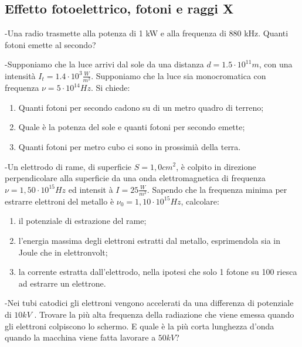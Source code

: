 \documentclass[12pt,twoside,a4]{article}
\begin{document}
\newpage
\subsection{Effetto fotoelettrico, fotoni e raggi X}
\begin{esercizio}
	-Una radio trasmette alla potenza di 1 kW e alla frequenza di 880 kHz. Quanti fotoni emette al secondo?
\end{esercizio}

\begin{esercizio}
	-Supponiamo che la luce arrivi dal sole da una distanza $d=1.5 \cdot 10^{11} m$, con una intensità  $I_t=1.4 \cdot 10^3 \frac{W}{m^2}$. Supponiamo che la luce sia monocromatica con frequenza $\nu =5 \cdot 10^{14} Hz$. Si chiede:
	\begin{enumerate}[label=(\textit{\roman*})]
		\item Quanti fotoni per secondo cadono su di un metro quadro di terreno;
		\item Quale  è la potenza del sole e quanti fotoni per secondo emette;
		\item Quanti fotoni per metro cubo ci sono in prossimià della terra.
	\end{enumerate}
\end{esercizio}

\begin{esercizio}
	-Un elettrodo di rame, di superficie $S=1,0 cm^2$,  è colpito in direzione
perpendicolare alla superficie da una onda elettromagnetica di frequenza $\nu = 1,50 \cdot 10^{15} Hz$ ed intensit à  $I=25\frac{W}{m^2}$. Sapendo che la frequenza minima per estrarre elettroni del metallo  è $\nu_0= 1,10 \cdot 10^{15}Hz$, calcolare:
\begin{enumerate}[label=(\textit{\roman*})]
	\item il potenziale di estrazione del rame;
	\item l'energia massima degli elettroni estratti dal metallo, esprimendola sia in Joule che in elettronvolt;
	\item la corrente estratta dall'elettrodo, nella ipotesi che solo 1 fotone su 100 riesca ad estrarre un elettrone.
\end{enumerate}
\end{esercizio}

\newpage
\begin{esercizio}
	-Nei tubi catodici gli elettroni vengono accelerati da una differenza di potenziale di $10 kV$ . Trovare la più  alta frequenza della radiazione che viene emessa quando gli elettroni colpiscono lo schermo. E quale è la più corta lunghezza d'onda quando la macchina viene fatta lavorare a $50 kV$?
\end{esercizio}
\end{document}

